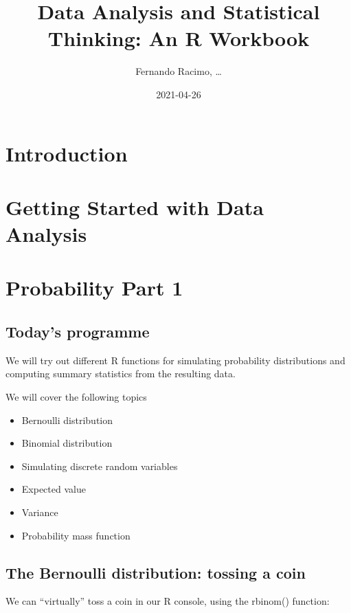 \documentclass[
]{book}
\title{Data Analysis and Statistical Thinking: An R Workbook}
\author{Fernando Racimo, \ldots{}}
\date{2021-04-26}
\providecommand{\tightlist}{%
  \setlength{\itemsep}{0pt}\setlength{\parskip}{0pt}}
\begin{document}
\maketitle

{
\setcounter{tocdepth}{1}
\tableofcontents
}
\hypertarget{introduction}{%
\chapter{Introduction}\label{introduction}}

\hypertarget{intro}{%
\chapter{Getting Started with Data Analysis}\label{intro}}

\hypertarget{prob1}{%
\chapter{Probability Part 1}\label{prob1}}

\hypertarget{todays-programme}{%
\section{Today's programme}\label{todays-programme}}

We will try out different R functions for simulating probability distributions and computing summary statistics from the resulting data.

We will cover the following topics

\begin{itemize}
\tightlist
\item
  Bernoulli distribution
\item
  Binomial distribution
\item
  Simulating discrete random variables
\item
  Expected value
\item
  Variance
\item
  Probability mass function
\end{itemize}

\hypertarget{the-bernoulli-distribution-tossing-a-coin}{%
\section{The Bernoulli distribution: tossing a coin}\label{the-bernoulli-distribution-tossing-a-coin}}

We can ``virtually'' toss a coin in our R console, using the rbinom() function:
\end{document}
